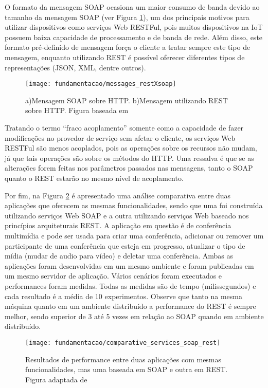 O formato da mensagem SOAP ocasiona um maior consumo de banda devido ao tamanho da mensagem SOAP (ver Figura \ref{fig:msg_soapXrest}), um dos principais motivos para utilizar dispositivos como serviços Web RESTFul, pois muitos dispositivos na IoT possuem baixa capacidade de processamento e de banda de rede. Além disso, este formato pré-definido de mensagem força o cliente a tratar sempre este tipo de mensagem, enquanto utilizando REST é possível oferecer diferentes tipos de representações (JSON, XML, dentre outros).\cite{Franca:2011}

\begin{figure}[!htb] \centering 
  \centering
  \texttt{[image: fundamentacao/messages\_restXsoap]} 
  \caption{a)Mensagem SOAP sobre HTTP. b)Mensagem utilizando REST sobre HTTP. Figura baseada em \cite{Pautasso:2014}} 
  \label{fig:msg_soapXrest}
\end{figure}

Tratando o termo ``fraco acoplamento'' somente como a capacidade de fazer modificações no provedor de serviço sem afetar o cliente, os serviços Web RESTFul são menos acoplados, pois as operações sobre os recursos não mudam, já que tais operações são sobre os métodos do HTTP. Uma ressalva é que se as alterações forem feitas nos parâmetros passados nas mensagens, tanto o SOAP quanto o REST estarão no mesmo nível de acoplamento.\cite{Franca:2011}

Por fim, na Figura \ref{fig:comparative_services_soap_rest} é apresentado uma análise comparativa entre duas aplicações que oferecem as mesmas funcionalidades, sendo que uma foi construída utilizando serviços Web SOAP e a outra utilizando serviços Web baseado nos princípios arquiteturais REST. A aplicação em questão é de conferência multimídia e pode ser usada para criar uma conferência, adicionar ou remover um participante de uma conferência que esteja em progresso, atualizar o tipo de mídia (mudar de audio para vídeo) e deletar uma conferência. Ambas as aplicações foram desenvolvidas em um mesmo ambiente e foram publicadas em um mesmo servidor de aplicação. Vários cenários foram executados e performances foram medidas. Todas as medidas são de tempo (milissegundos) e cada resultado é a média de 10 experimentos. Observe que tanto na mesma máquina quanto em um ambiente distribuído a performance do REST é sempre melhor, sendo superior de 3 até 5 vezes em relação ao SOAP quando em ambiente distribuído.\cite{Belqasmi:2012}

\begin{figure}[!htb] \centering 
  \centering
  \texttt{[image: fundamentacao/comparative\_services\_soap\_rest]} 
  \caption{Resultados de performance entre duas aplicações com mesmas funcionalidades, mas uma baseada em SOAP e outra em REST. Figura adaptada de \cite{Belqasmi:2012}} 
  \label{fig:comparative_services_soap_rest}
\end{figure}


